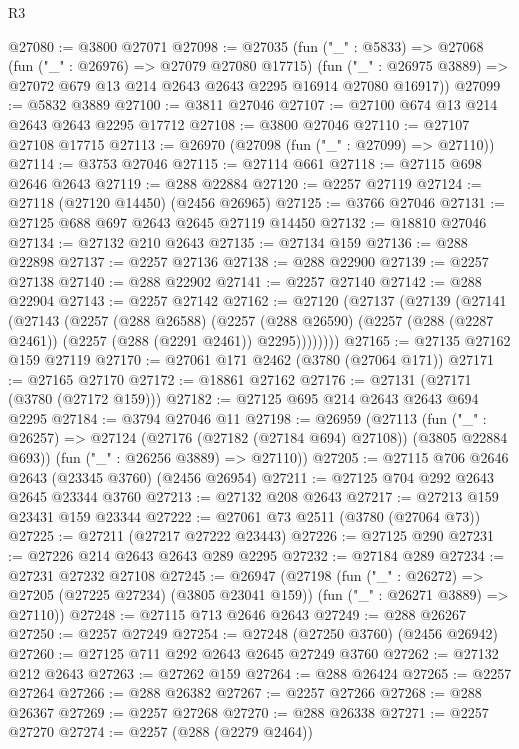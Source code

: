 \begin{lexlean}{R3}
\begin{coremodule}
@27080 := @3800 @27071
@27098 := @27035
    (fun ("_" : @5833) =>
    @27068
      (fun ("_" : @26976) => @27079 @27080 @17715)
      (fun ("_" : @26975 @3889) => @27072 @679 @13 @214 @2643 @2643 @2295 @16914 @27080 @16917))
@27099 := @5832 @3889
@27100 := @3811 @27046
@27107 := @27100 @674 @13 @214 @2643 @2643 @2295 @17712
@27108 := @3800 @27046
@27110 := @27107 @27108 @17715
@27113 := @26970 (@27098 (fun ("_" : @27099) => @27110))
@27114 := @3753 @27046
@27115 := @27114 @661
@27118 := @27115 @698 @2646 @2643
@27119 := @288 @22884
@27120 := @2257 @27119
@27124 := @27118 (@27120 @14450) (@2456 @26965)
@27125 := @3766 @27046
@27131 := @27125 @688 @697 @2643 @2645 @27119 @14450
@27132 := @18810 @27046
@27134 := @27132 @210 @2643
@27135 := @27134 @159
@27136 := @288 @22898
@27137 := @2257 @27136
@27138 := @288 @22900
@27139 := @2257 @27138
@27140 := @288 @22902
@27141 := @2257 @27140
@27142 := @288 @22904
@27143 := @2257 @27142
@27162 := @27120
    (@27137
      (@27139
        (@27141
          (@27143
            (@2257
              (@288 @26588)
              (@2257
                (@288 @26590)
                (@2257 (@288 (@2287 @2461)) (@2257 (@288 (@2291 @2461)) @2295))))))))
@27165 := @27135 @27162 @159 @27119
@27170 := @27061 @171 @2462 (@3780 (@27064 @171))
@27171 := @27165 @27170
@27172 := @18861 @27162
@27176 := @27131 (@27171 (@3780 (@27172 @159)))
@27182 := @27125 @695 @214 @2643 @2643 @694 @2295
@27184 := @3794 @27046 @11
@27198 := @26959
    (@27113
      (fun ("_" : @26257) => @27124 (@27176 (@27182 (@27184 @694) @27108)) (@3805 @22884 @693))
      (fun ("_" : @26256 @3889) => @27110))
@27205 := @27115 @706 @2646 @2643 (@23345 @3760) (@2456 @26954)
@27211 := @27125 @704 @292 @2643 @2645 @23344 @3760
@27213 := @27132 @208 @2643
@27217 := @27213 @159 @23431 @159 @23344
@27222 := @27061 @73 @2511 (@3780 (@27064 @73))
@27225 := @27211 (@27217 @27222 @23443)
@27226 := @27125 @290
@27231 := @27226 @214 @2643 @2643 @289 @2295
@27232 := @27184 @289
@27234 := @27231 @27232 @27108
@27245 := @26947
    (@27198
      (fun ("_" : @26272) => @27205 (@27225 @27234) (@3805 @23041 @159))
      (fun ("_" : @26271 @3889) => @27110))
@27248 := @27115 @713 @2646 @2643
@27249 := @288 @26267
@27250 := @2257 @27249
@27254 := @27248 (@27250 @3760) (@2456 @26942)
@27260 := @27125 @711 @292 @2643 @2645 @27249 @3760
@27262 := @27132 @212 @2643
@27263 := @27262 @159
@27264 := @288 @26424
@27265 := @2257 @27264
@27266 := @288 @26382
@27267 := @2257 @27266
@27268 := @288 @26367
@27269 := @2257 @27268
@27270 := @288 @26338
@27271 := @2257 @27270
@27274 := @2257 (@288 (@2279 @2464))

\end{coremodule}
\end{lexlean}
